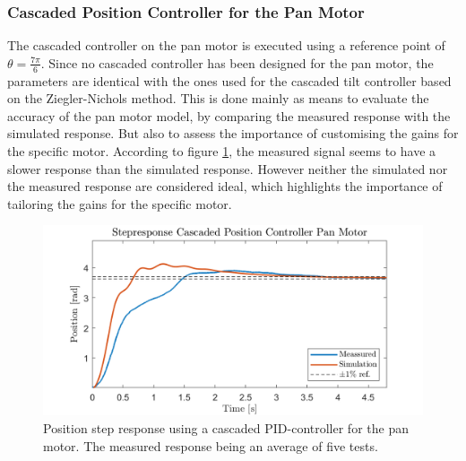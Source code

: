 \documentclass[../../main.tex]{subfiles}
\begin{document}
\subsubsection*{Cascaded Position Controller for the Pan Motor}
The cascaded controller on the pan motor is executed using a reference point of $\theta = \frac{7\pi}{6}$. Since no cascaded controller has been designed for the pan motor, the parameters are identical with the ones used for the cascaded tilt controller based on the Ziegler-Nichols method. This is done mainly as means to evaluate the accuracy of the pan motor model, by comparing the measured response with the simulated response. But also to assess the importance of customising the gains for the specific motor.
According to figure \ref{fig:cascade_ZN_pan}, the measured signal seems to have a slower response than the simulated response. However neither the simulated nor the measured response are considered ideal, which highlights the importance of tailoring the gains for the specific motor.

\begin{figure}[h]
    \centering
    \includegraphics[width = 0.7 \textwidth]{Sections/Test/Images/cascade_ZN_pan.png}
    \caption{Position step response using a cascaded PID-controller for the pan motor. The measured response being an average of five tests.}
    \label{fig:cascade_ZN_pan}
\end{figure}
\end{document}
